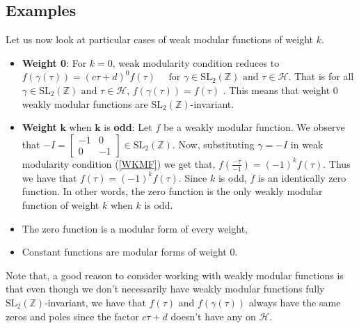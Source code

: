 \subsection{Examples}
Let us now look at particular cases of weak modular functions of weight \textbf{$k$}. 
\begin{itemize}
    \item \textbf{Weight 0}: 
    For $k=0$, weak modularity condition reduces to $
f(\gamma(\tau))=(c \tau+d)^{0} f(\tau) \quad \text { for } \gamma \in \mathrm{SL}_{2}(\mathbb{Z}) \text { and } \tau \in \mathcal{H}.
$ That is for all $\gamma \in \mathrm{SL}_{2}(\mathbb{Z}) \text { and } \tau \in \mathcal{H}$, 
$ f(\gamma(\tau))= f(\tau)$ . This means that weight 0 weakly modular functions are $\mathrm{SL}_{2}(\mathbb{Z})$-invariant.  
\item \textbf{Weight} $\bm{k}$ when $\bm{k}$ is \textbf{odd}: Let $f$ be a weakly modular function. We observe that $-I=\left[\begin{array}{rr}-1 & 0 \\ 0 & -1\end{array}\right] \in \mathrm{SL_2}(\mathbb{Z})$. Now, substituting $\gamma=-I$ in weak modularity condition (\ref{WKMF}) we get that, $f(\frac{-\tau}{-1})=(-1)^k f(\tau)$.
Thus we have that $f(\tau)=(-1)^k f(\tau)$. Since $k$ is odd, $f$ is an identically zero function. In other words, the zero function is the only weakly modular function of weight $k$ when $k$ is odd. 
\item The zero function is a modular form of every weight,
\item Constant functions are modular forms of weight 0. 

\end{itemize}

Note that, a good reason to consider working with weakly modular functions is that even though we don't necessarily have weakly modular functions fully $\mathrm{SL}_{2}(\mathbb{Z})$-invariant, we have that $f(\tau)$ and $f(\gamma(\tau))$ always have the same zeros and poles since the factor $c \tau+d$ doesn't have any on $\mathcal{H}$. 



